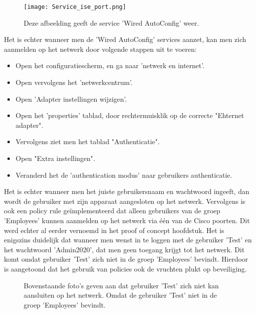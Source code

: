 \begin{figure}[H]
	\centering
	\texttt{[image: Service\_ise\_port.png]}
	\caption{Deze afbeelding geeft de service 'Wired AutoConfig' weer.}
\end{figure}
\newpage
Het is echter wanneer men de 'Wired AutoConfig' services aanzet, kan men zich aanmelden op het netwerk door volgende stappen uit te voeren: 
\newline

\begin{itemize}
	\item Open het configuratiescherm, en ga naar 'netwerk en internet'.
	\item Open vervolgens het 'netwerkcentrum'.
	\item Open 'Adapter instellingen wijzigen'.
	\item Open het 'properties' tablad, door rechtermuisklik op de  correcte "Ehternet adapter".
	\item Vervolgens ziet men het tablad "Authenticatie".
	\item Open "Extra instellingen".
	\item Veranderd het de 'authentication modus' naar gebruikers authenticatie.
	\newline
\end{itemize}


Het is echter wanneer men het juiste gebruikersnaam en wachtwoord ingeeft, dan wordt de gebruiker met zijn apparaat aangesloten op het netwerk. Vervolgens is ook een policy rule geïmplementeerd dat alleen gebruikers van de groep 'Employees' kunnen aanmelden op het netwerk via één van de Cisco poorten. Dit werd echter al eerder vernoemd in het proof of concept hoofdstuk. 
\newline
\newline
Het is enigszins duidelijk dat wanneer men wenst in te loggen met de gebruiker 'Test' en het wachtwoord 'Admin2020', dat men geen toegang krijgt tot het netwerk. Dit komt omdat gebruiker 'Test' zich niet in de groep 'Employees' bevindt. Hierdoor is aangetoond dat het gebruik van policies ook de vruchten plukt op beveiliging.

\begin{figure}[H]
	\centering
	\qquad
	\newline
	\qquad
	\caption{Bovenstaande foto's geven aan dat gebruiker 'Test' zich niet kan aansluiten op het netwerk. Omdat de gebruiker 'Test' niet in de groep 'Employees' bevindt.}%
	\label{fig:Test_gebruiker}%
\end{figure}
	

